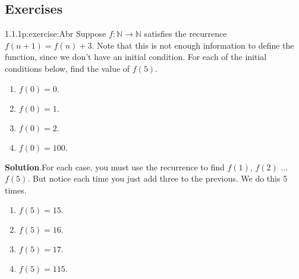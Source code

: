 \documentclass[twoside,11pt,]{book}
\newcommand{\blocktitlefont}{\relax}
\numberwithin{equation}{chapter}
\newcommand{\N}{\mathbb N}
\begin{document}
\subsection*{Exercises}
\begin{divisionsolution}{1.1.1}{}{p:exercise:Abr}%
Suppose \(f:\N \to \N\) satisfies the recurrence \(f(n+1) = f(n) + 3\text{.}\) Note that this is not enough information to define the function, since we don't have an initial condition. For each of the initial conditions below, find the value of \(f(5)\text{.}\)%
\begin{enumerate}[label=(\alph*)]
\item{}\(f(0) = 0\text{.}\)%
\item{}\(f(0) = 1\text{.}\)%
\item{}\(f(0) = 2\text{.}\)%
\item{}\(f(0) = 100\text{.}\)%
\end{enumerate}
%
\par\smallskip%
\noindent\textbf{\blocktitlefont Solution}.\quad{}For each case, you must use the recurrence to find \(f(1)\text{,}\) \(f(2)\) ... \(f(5)\text{.}\) But notice each time you just add three to the previous. We do this 5 times.%
\begin{enumerate}[label=(\alph*)]
\item{}\(f(5) = 15\text{.}\)%
\item{}\(f(5) = 16\text{.}\)%
\item{}\(f(5) = 17\text{.}\)%
\item{}\(f(5) = 115\text{.}\)%
\end{enumerate}
%
\end{divisionsolution}%
\end{document}
